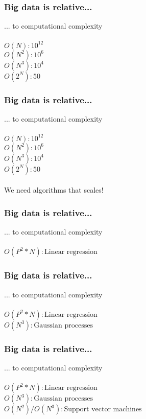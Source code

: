 \documentclass{beamer}
\begin{document}
\begin{frame}
	\frametitle{Big data is relative...}
	\begin{center}
		... to computational complexity\\~\\
		$O(N) : 10^{12}$\\
		$O(N^2) : 10^{6}$\\
		$O(N^3) : 10^{4}$\\
		$O(2^N) : 50$\\
	\end{center}
\end{frame}

\begin{frame}
	\frametitle{Big data is relative...}
	\begin{center}
		... to computational complexity\\~\\
		$O(N) : 10^{12}$\\
		$O(N^2) : 10^{6}$\\
		$O(N^3) : 10^{4}$\\
		$O(2^N) : 50$\\~\\
		We need algorithms that scales!
	\end{center}
\end{frame}

\begin{frame}
	\frametitle{Big data is relative...}
	\begin{center}
		... to computational complexity\\~\\
		$O(P^2 * N) : \text{Linear regression}$
	\end{center}
\end{frame}

\begin{frame}
	\frametitle{Big data is relative...}
	\begin{center}
		... to computational complexity\\~\\
		$O(P^2 * N) : \text{Linear regression}$\\
		$O(N^3) : \text{Gaussian processes}$
	\end{center}
\end{frame}

\begin{frame}
	\frametitle{Big data is relative...}
	\begin{center}
		... to computational complexity\\~\\
		$O(P^2 * N) : \text{Linear regression}$\\
		$O(N^3) : \text{Gaussian processes}$\\
		$O(N^2) / O(N^3) : \text{Support vector machines}$\\
	\end{center}
\end{frame}
\end{document}

